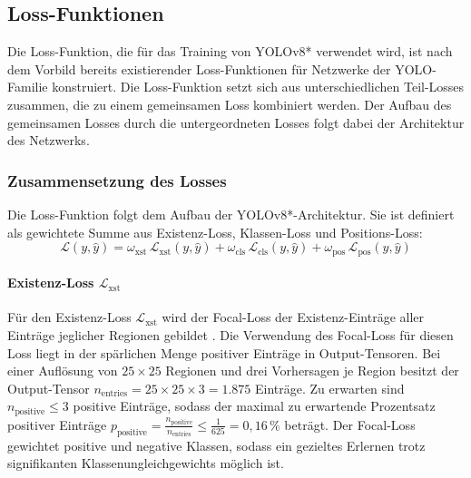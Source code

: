 
\vspace*{-0.2cm}
\subsection{Loss-Funktionen}
\label{sec:losses}

Die Loss-Funktion, die für das Training von YOLOv8* verwendet wird, ist nach dem Vorbild bereits existierender Loss-Funktionen für Netzwerke der YOLO-Familie konstruiert. Die Loss-Funktion setzt sich aus unterschiedlichen Teil-Losses zusammen, die zu einem gemeinsamen Loss kombiniert werden. Der Aufbau des gemeinsamen Losses durch die untergeordneten Losses folgt dabei der Architektur des Netzwerks.

\vspace*{-0.1cm}
\subsubsection{Zusammensetzung des Losses}

Die Loss-Funktion folgt dem Aufbau der YOLOv8*-Architektur. Sie ist definiert als gewichtete Summe aus Existenz-Loss, Klassen-Loss und Positions-Loss:
\[ \mathcal{L}(y, \hat{y}) = \omega_\text{xst}\,\mathcal{L}_\text{xst}(y, \hat{y}) + \omega_\text{cls}\,\mathcal{L}_\text{cls}(y, \hat{y}) + \omega_\text{pos}\,\mathcal{L}_\text{pos}(y, \hat{y}) \]

\vspace*{-0.4cm}
\paragraph{Existenz-Loss $\mathcal{L}_\text{xst}$}

Für den Existenz-Loss $\mathcal{L}_\text{xst}$ wird der Focal-Loss der Existenz-Einträge aller Einträge jeglicher Regionen gebildet \cite{focal_loss}. Die Verwendung des Focal-Loss für diesen Loss liegt in der spärlichen Menge positiver Einträge in Output-Tensoren. Bei einer Auflösung von $25 \times 25$ Regionen und drei Vorhersagen je Region besitzt der Output-Tensor $n_\text{entries} = 25 \times 25 \times 3 = 1.875$ Einträge. Zu erwarten sind $ n_\text{positive} \leq 3 $ positive Einträge, sodass der maximal zu erwartende Prozentsatz positiver Einträge $p_\text{positive} = \frac{n_\text{positive}}{n_\text{entries}} \leq \frac{1}{625} = 0,16\,\%$ beträgt. Der Focal-Loss gewichtet positive und negative Klassen, sodass ein gezieltes Erlernen trotz signifikanten Klassenungleichgewichts möglich ist.

